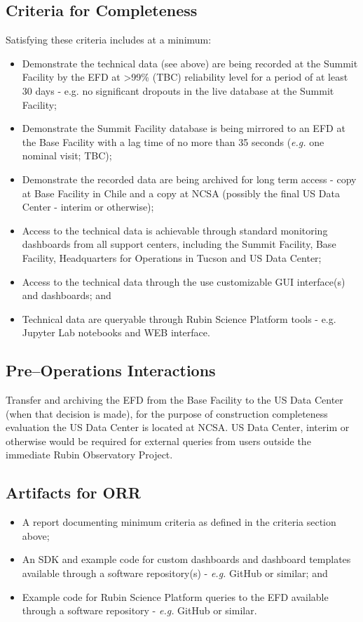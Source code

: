 \subsection{Criteria for Completeness}

Satisfying these criteria includes at a minimum:
\begin{itemize}
	\item Demonstrate the technical data (see above) are being recorded at the Summit Facility by the EFD at >99\% (TBC) reliability level for a period of at least 30 days - e.g. no significant dropouts in the live database at the Summit Facility;
	\item Demonstrate the Summit Facility database is being mirrored to an EFD at the Base Facility with a lag time of no more than 35 seconds ({\it e.g.} one nominal visit; TBC);
	\item Demonstrate the recorded data are being archived for long term access - copy at Base Facility in Chile and a copy at NCSA (possibly the final US Data Center - interim or otherwise);
	\item Access to the technical data is achievable through standard monitoring dashboards from all support centers, including the Summit Facility, Base Facility, Headquarters for Operations in Tucson and US Data Center;
	\item Access to the technical data through the use customizable GUI interface(s) and dashboards; and
	\item Technical data are queryable through Rubin Science Platform tools - e.g. Jupyter Lab notebooks and WEB interface.	
\end{itemize}

\subsection{Pre--Operations Interactions}

Transfer and archiving the EFD from the Base Facility to the US Data Center (when that decision is made), for the purpose of construction completeness evaluation the US Data Center is located at NCSA. US Data Center, interim  or otherwise would be required for external queries from users outside the immediate Rubin Observatory Project.

\subsection{Artifacts for ORR}
\begin{itemize}
	\item A report documenting minimum criteria as defined in the criteria section above;
	\item An SDK and example code for custom dashboards and dashboard templates available through a software repository(s) - {\it e.g.} GitHub or similar; and
	\item Example code for Rubin Science Platform queries to the EFD available through a software repository - {\it e.g.} GitHub or similar.	
\end{itemize}